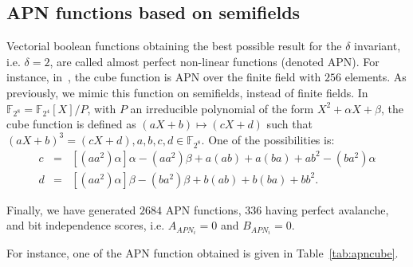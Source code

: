 \documentclass{article}\usepackage{amsthm}
\newcommand{\F}{{\mathbb F}}
\begin{document}
\subsection{APN functions based on semifields}
Vectorial boolean functions obtaining the best possible result for the $\delta$ invariant,
i.e. $\delta =2$, are called almost perfect non-linear functions (denoted APN). For instance,
in~\cite{Alvarez:2008:apn}, the cube
function is APN over the finite field with $256$ elements. As previously, we mimic this function on
semifields, instead of finite fields. In $\F_{2^8} =
\mathbb{F}_{2^4}[X]/P$, with $P$ an irreducible polynomial of the form
$X^2+\alpha X + \beta$, the cube function is defined as $(aX+b) \mapsto (cX+d)$ such that $(aX+b)^3 = (cX+d),
a,b,c,d \in \F_{2^8}$. One of the possibilities is: 
\begin{equation}
  \begin{array}{lclclc}
    c & = &[(aa^2)\alpha]\alpha - (aa^2)\beta +a(ab) +a(ba) + ab^2 -(ba^2)\alpha \\
    d & = &[(aa^2)\alpha]\beta -(ba^2)\beta +b(ab) +b(ba) + bb^2. 
  \end{array}
  \label{eq6}
\end{equation}

Finally, we have generated $2684$ APN functions, $336$ having perfect avalanche,
and bit independence scores, i.e. $A_{APN_i}=0$ and $B_{APN_i}=0$.

For instance, one of the APN function obtained is given in Table~\ref{tab:apncube}.
\end{document}
